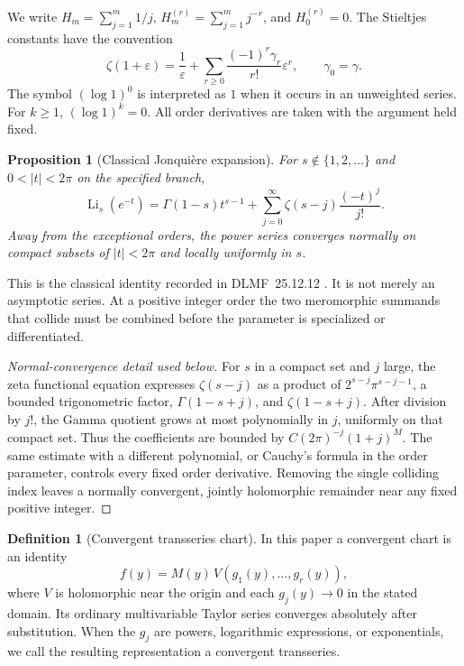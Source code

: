 \documentclass[11pt,a4paper]{article}
\numberwithin{equation}{section}
\newtheorem{proposition}[theorem]{Proposition}
\theoremstyle{definition}
\newtheorem{definition}[theorem]{Definition}
\theoremstyle{remark}
\DeclareMathOperator{\Li}{Li}
\newcommand{\eps}{\varepsilon}
\begin{document}
We write \(H_m=\sum_{j=1}^m1/j\),
\(H_m^{(r)}=\sum_{j=1}^m j^{-r}\), and \(H_0^{(r)}=0\).
The Stieltjes constants have the convention
\begin{equation}
 \zeta(1+\eps)=\frac1\eps+
 \sum_{r\ge0}\frac{(-1)^r\gamma_r}{r!}\eps^r,
 \qquad\gamma_0=\gamma.
 \label{eq:stieltjes}
\end{equation}
The symbol \((\log1)^0\) is interpreted as \(1\) when it occurs in an
unweighted series.  For \(k\ge1\), \((\log1)^k=0\).
All order derivatives are taken with the argument held fixed.

\begin{proposition}[Classical Jonqui\`ere expansion]
\label{prop:jonquiere}
For \(s\notin\{1,2,\ldots\}\) and \(0<|t|<2\pi\) on the specified branch,
\begin{equation}
 \Li_s(e^{-t})=\Gamma(1-s)t^{s-1}
       +\sum_{j=0}^\infty\zeta(s-j)\frac{(-t)^j}{j!}.
 \label{eq:jonquiere}
\end{equation}
Away from the exceptional orders, the power series converges normally
on compact subsets of \(|t|<2\pi\) and locally uniformly in \(s\).
\end{proposition}

This is the classical identity recorded in DLMF~25.12.12
\cite{dlmf-poly}.  It is not merely an asymptotic series.  At a positive
integer order the two meromorphic summands that collide must be
combined before the parameter is specialized or differentiated.

\begin{proof}[Normal-convergence detail used below]
For \(s\) in a compact set and \(j\) large, the zeta functional equation
expresses \(\zeta(s-j)\) as a product of
\(2^{s-j}\pi^{s-j-1}\), a bounded trigonometric factor,
\(\Gamma(1-s+j)\), and \(\zeta(1-s+j)\).
After division by \(j!\), the Gamma quotient grows at most
polynomially in \(j\), uniformly on that compact set.
Thus the coefficients are bounded by
\(C(2\pi)^{-j}(1+j)^M\).
The same estimate with a different polynomial, or Cauchy's formula in
the order parameter, controls every fixed order derivative.
Removing the single colliding index leaves a normally convergent,
jointly holomorphic remainder near any fixed positive integer.
\end{proof}

\begin{definition}[Convergent transseries chart]
In this paper a convergent chart is an identity
\[
 f(y)=M(y)\,V(g_1(y),\ldots,g_r(y)),
\]
where \(V\) is holomorphic near the origin and each \(g_j(y)\to0\)
in the stated domain.  Its ordinary multivariable Taylor series
converges absolutely after substitution.  When the \(g_j\) are powers,
logarithmic expressions, or exponentials, we call the resulting
representation a convergent transseries.
\end{definition}
\end{document}
